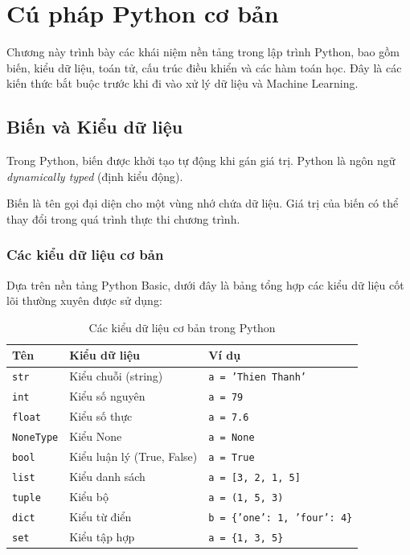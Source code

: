 \chapter{Cú pháp Python cơ bản}

Chương này trình bày các khái niệm nền tảng trong lập trình Python, bao gồm biến, kiểu dữ liệu, toán tử, cấu trúc điều khiển và các hàm toán học. Đây là các kiến thức bắt buộc trước khi đi vào xử lý dữ liệu và Machine Learning.

\section{Biến và Kiểu dữ liệu}

Trong Python, biến được khởi tạo tự động khi gán giá trị. Python là ngôn ngữ \textit{dynamically typed} (định kiểu động).

\begin{definition}
Biến là tên gọi đại diện cho một vùng nhớ chứa dữ liệu. Giá trị của biến có thể thay đổi trong quá trình thực thi chương trình.
\end{definition}

\subsection{Các kiểu dữ liệu cơ bản}
Dựa trên nền tảng Python Basic, dưới đây là bảng tổng hợp các kiểu dữ liệu cốt lõi thường xuyên được sử dụng:

\begin{table}[h]
\centering
\begin{tabular}{|l|l|l|}
\hline
\textbf{Tên} & \textbf{Kiểu dữ liệu} & \textbf{Ví dụ} \\
\hline
\texttt{str} & Kiểu chuỗi (string) & \texttt{a = 'Thien Thanh'} \\
\hline
\texttt{int} & Kiểu số nguyên & \texttt{a = 79} \\
\hline
\texttt{float} & Kiểu số thực & \texttt{a = 7.6} \\
\hline
\texttt{NoneType} & Kiểu None & \texttt{a = None} \\
\hline
\texttt{bool} & Kiểu luận lý (True, False) & \texttt{a = True} \\
\hline
\texttt{list} & Kiểu danh sách & \texttt{a = [3, 2, 1, 5]} \\
\hline
\texttt{tuple} & Kiểu bộ & \texttt{a = (1, 5, 3)} \\
\hline
\texttt{dict} & Kiểu từ điển & \texttt{b = \{'one': 1, 'four': 4\}} \\
\hline
\texttt{set} & Kiểu tập hợp & \texttt{a = \{1, 3, 5\}} \\
\hline
\end{tabular}
\caption{Các kiểu dữ liệu cơ bản trong Python}
\end{table}

